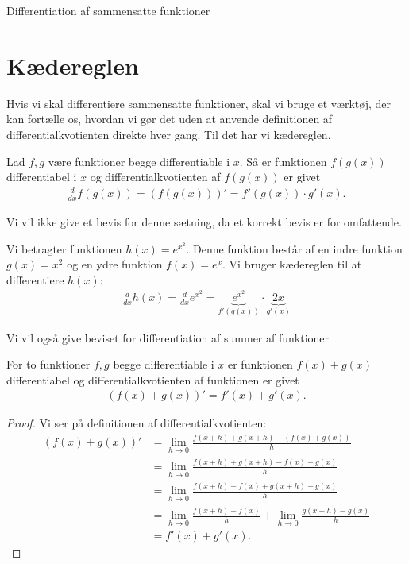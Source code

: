 \begin{center}
\Huge
Differentiation af sammensatte funktioner
\end{center}
\section*{Kædereglen}

Hvis vi skal differentiere sammensatte funktioner, skal vi bruge et værktøj, der kan fortælle os, hvordan vi gør det uden at anvende definitionen af differentialkvotienten direkte hver gang. Til det har vi kædereglen.
\begin{setn}[Kædereglen]
Lad $f,g$ være funktioner begge differentiable i $x$. Så er funktionen $f(g(x))$ differentiabel i $x$ og 
differentialkvotienten af $f(g(x))$ er givet
\begin{align*}
\frac{d}{dx}f(g(x)) = (f(g(x)))' = f'(g(x))\cdot g'(x).
\end{align*}
\end{setn}
Vi vil ikke give et bevis for denne sætning, da et korrekt bevis er for omfattende. 
\begin{exa}
Vi betragter funktionen $h(x) = e^{x^2}$. Denne funktion består af en indre funktion $g(x)=x^2$ og en ydre funktion $f(x)=e^x$. Vi bruger kædereglen til at differentiere $h(x)$:
\begin{align*}
\frac{d}{d x} h(x) = \frac{d}{dx}e^{x^2} = \underbrace{e^{x^2}}_{f'(g(x))}\cdot \underbrace{2x}_{g'(x)}
\end{align*}
\end{exa}
Vi vil også give beviset for differentiation af summer af funktioner
\begin{setn}
For to funktioner $f,g$ begge differentiable i $x$ er funktionen $f(x)+g(x)$ differentiabel og differentialkvotienten af funktionen er givet
\begin{align*}
(f(x)+g(x))' = f'(x)+g'(x).
\end{align*}
\end{setn}
\begin{proof}
Vi ser på definitionen af differentialkvotienten:
\begin{align*}
(f(x)+g(x))' &= \lim_{h\to 0} \frac{f(x+h)+g(x+h)-(f(x)+g(x))}{h}\\
&= \lim_{h\to 0} \frac{f(x+h)+g(x+h)-f(x)-g(x)}{h}\\
&=\lim_{h\to 0} \frac{f(x+h) -f(x) + g(x+h)-g(x)}{h}\\
&= \lim_{h\to 0}\frac{f(x+h)-f(x)}{h} + \lim_{h\to 0} \frac{g(x+h)-g(x)}{h}\\
&= f'(x)+g'(x).
\end{align*}
\end{proof}
